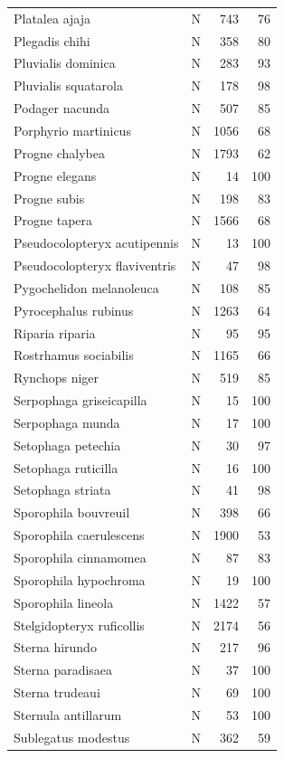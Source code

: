 \documentclass[
]{scrbook}
\begin{document}
\begin{table}
\begin{tabular}{llrr}
Platalea ajaja & N & 743 & 76\\
Plegadis chihi & N & 358 & 80\\
Pluvialis dominica & N & 283 & 93\\
Pluvialis squatarola & N & 178 & 98\\
\addlinespace
Podager nacunda & N & 507 & 85\\
Porphyrio martinicus & N & 1056 & 68\\
Progne chalybea & N & 1793 & 62\\
Progne elegans & N & 14 & 100\\
Progne subis & N & 198 & 83\\
\addlinespace
Progne tapera & N & 1566 & 68\\
Pseudocolopteryx acutipennis & N & 13 & 100\\
Pseudocolopteryx flaviventris & N & 47 & 98\\
Pygochelidon melanoleuca & N & 108 & 85\\
Pyrocephalus rubinus & N & 1263 & 64\\
\addlinespace
Riparia riparia & N & 95 & 95\\
Rostrhamus sociabilis & N & 1165 & 66\\
Rynchops niger & N & 519 & 85\\
Serpophaga griseicapilla & N & 15 & 100\\
Serpophaga munda & N & 17 & 100\\
\addlinespace
Setophaga petechia & N & 30 & 97\\
Setophaga ruticilla & N & 16 & 100\\
Setophaga striata & N & 41 & 98\\
Sporophila bouvreuil & N & 398 & 66\\
Sporophila caerulescens & N & 1900 & 53\\
\addlinespace
Sporophila cinnamomea & N & 87 & 83\\
Sporophila hypochroma & N & 19 & 100\\
Sporophila lineola & N & 1422 & 57\\
Stelgidopteryx ruficollis & N & 2174 & 56\\
Sterna hirundo & N & 217 & 96\\
\addlinespace
Sterna paradisaea & N & 37 & 100\\
Sterna trudeaui & N & 69 & 100\\
Sternula antillarum & N & 53 & 100\\
Sublegatus modestus & N & 362 & 59\\

\end{tabular}
\end{table}
\end{document}
